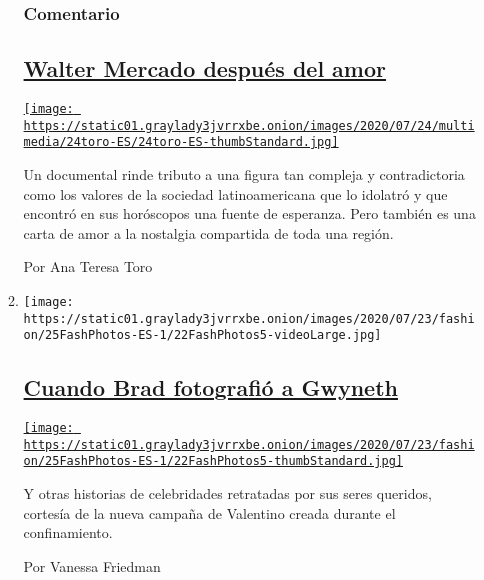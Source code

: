 \begin{enumerate}
\begin{enumerate}
    \hypertarget{comentario}{%
    \subsubsection{Comentario}\label{comentario}}

    \hypertarget{walter-mercado-despuuxe9s-del-amor}{%
    \subsection{\texorpdfstring{\href{/es/2020/07/24/espanol/opinion/walter-mercado-amor-netflix.html}{Walter
    Mercado después del
    amor}}{Walter Mercado después del amor}}\label{walter-mercado-despuuxe9s-del-amor}}

    \href{/es/2020/07/24/espanol/opinion/walter-mercado-amor-netflix.html}{\texttt{[image: https://static01.graylady3jvrrxbe.onion/images/2020/07/24/multimedia/24toro-ES/24toro-ES-thumbStandard.jpg]}}

    Un documental rinde tributo a una figura tan compleja y
    contradictoria como los valores de la sociedad latinoamericana que
    lo idolatró y que encontró en sus horóscopos una fuente de
    esperanza. Pero también es una carta de amor a la nostalgia
    compartida de toda una región.

    Por Ana Teresa Toro
  \item
    \texttt{[image: https://static01.graylady3jvrrxbe.onion/images/2020/07/23/fashion/25FashPhotos-ES-1/22FashPhotos5-videoLarge.jpg]}

    \hypertarget{cuando-brad-fotografiuxf3-a-gwyneth}{%
    \subsection{\texorpdfstring{\href{/es/2020/07/25/espanol/estilos-de-vida/gwyneth-paltrow-valentino.html}{Cuando
    Brad fotografió a
    Gwyneth}}{Cuando Brad fotografió a Gwyneth}}\label{cuando-brad-fotografiuxf3-a-gwyneth}}

    \href{/es/2020/07/25/espanol/estilos-de-vida/gwyneth-paltrow-valentino.html}{\texttt{[image: https://static01.graylady3jvrrxbe.onion/images/2020/07/23/fashion/25FashPhotos-ES-1/22FashPhotos5-thumbStandard.jpg]}}

    Y otras historias de celebridades retratadas por sus seres queridos,
    cortesía de la nueva campaña de Valentino creada durante el
    confinamiento.

    Por Vanessa Friedman
  \end{enumerate}
\end{enumerate}

